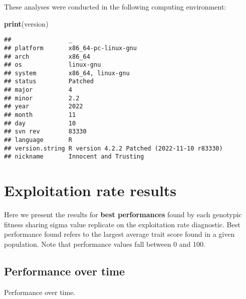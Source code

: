 \documentclass[]{book}
\newenvironment{Shaded}{\begin{snugshade}}{\end{snugshade}}
\newcommand{\KeywordTok}[1]{\textcolor[rgb]{0.13,0.29,0.53}{\textbf{#1}}}
\newcommand{\NormalTok}[1]{#1}
\begin{document}
These analyses were conducted in the following computing environment:

\begin{Shaded}
\begin{Highlighting}[]
\KeywordTok{print}\NormalTok{(version)}
\end{Highlighting}
\end{Shaded}

\begin{verbatim}
##                _                                          
## platform       x86_64-pc-linux-gnu                        
## arch           x86_64                                     
## os             linux-gnu                                  
## system         x86_64, linux-gnu                          
## status         Patched                                    
## major          4                                          
## minor          2.2                                        
## year           2022                                       
## month          11                                         
## day            10                                         
## svn rev        83330                                      
## language       R                                          
## version.string R version 4.2.2 Patched (2022-11-10 r83330)
## nickname       Innocent and Trusting
\end{verbatim}

\hypertarget{exploitation-rate-results-5}{%
\section{Exploitation rate results}\label{exploitation-rate-results-5}}

Here we present the results for \textbf{best performances} found by each genotypic fitness sharing sigma value replicate on the exploitation rate diagnostic.
Best performance found refers to the largest average trait score found in a given population.
Note that performance values fall between 0 and 100.

\hypertarget{performance-over-time-14}{%
\subsection{Performance over time}\label{performance-over-time-14}}

Performance over time.
\end{document}

